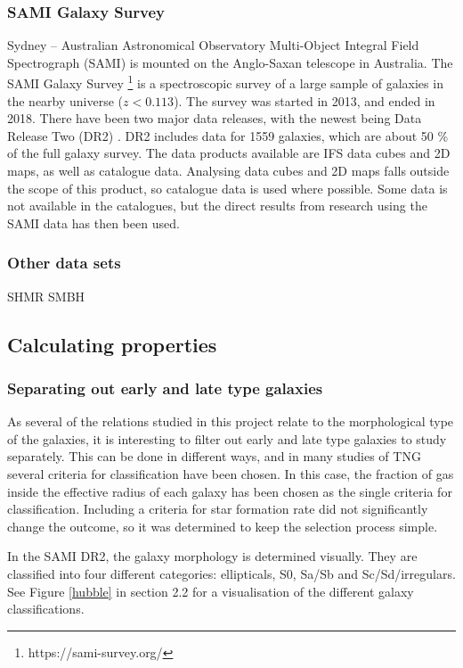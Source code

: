 \subsubsection{SAMI Galaxy Survey}
Sydney – Australian Astronomical Observatory Multi-Object Integral Field Spectrograph (SAMI) is mounted on the Anglo-Saxan telescope in Australia. The SAMI Galaxy Survey \footnote{https://sami-survey.org/} is a spectroscopic survey of a large sample of galaxies in the nearby universe ($z < 0.113$). The survey was started in 2013, and ended in 2018. There have been two major data releases, with the newest being Data Release Two (DR2) \parencite{Scott2018}. DR2 includes data for 1559 galaxies, which are about 50 \% of the full galaxy survey. The data products available are IFS data cubes and 2D maps, as well as catalogue data. Analysing data cubes and 2D maps falls outside the scope of this product, so catalogue data is used where possible. Some data is not available in the catalogues, but the direct results from research using the SAMI data has then been used.


\subsubsection{Other data sets}
SHMR
SMBH

\subsection{Calculating properties}


\subsubsection{Separating out early and late type galaxies}
As several of the relations studied in this project relate to the morphological type of the galaxies, it is interesting to filter out early and late type galaxies to study separately. This can be done in different ways, and in many studies of TNG several criteria for classification have been chosen. In this case, the fraction of gas inside the effective radius of each galaxy has been chosen as the single criteria for classification. Including a criteria for star formation rate did not significantly change the outcome, so it was determined to keep the selection process simple.

In the SAMI DR2, the galaxy morphology is determined visually. They are classified into four different categories: ellipticals, S0, Sa/Sb and Sc/Sd/irregulars. See Figure \ref{hubble} in section 2.2 for a visualisation of the different galaxy classifications.

